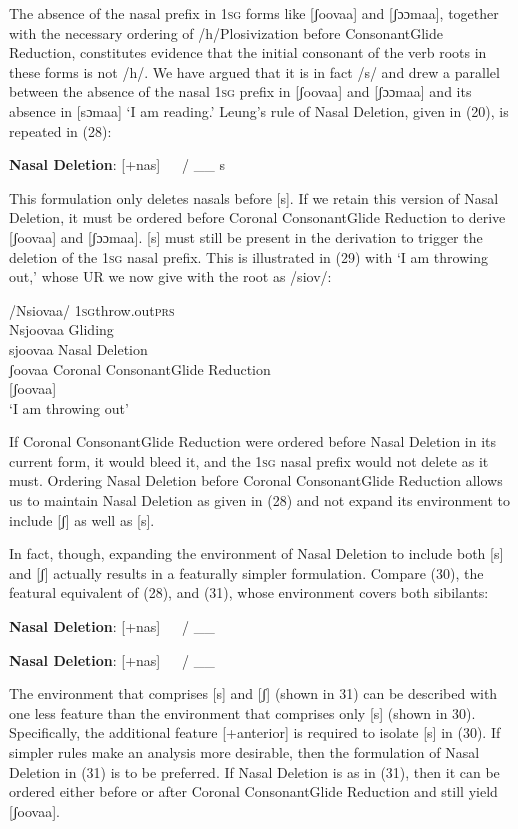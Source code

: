 \documentclass[output=paper]{langsci/langscibook}
\begin{document}
The absence of the nasal prefix in 1\textsc{sg} forms like [ʃoovaa] and [ʃɔɔmaa], together with the necessary ordering of /h/Plosivization before ConsonantGlide Reduction, constitutes evidence that the initial consonant of the verb roots in these forms is not /h/. We have argued that it is in fact /s/ and drew a parallel between the absence of the nasal 1\textsc{sg} prefix in [ʃoovaa] and [ʃɔɔmaa] and its absence in [sɔmaa] ‘I am reading.’ Leung’s rule of Nasal Deletion, given in (20), is repeated in (28):

\ea{}
 \textbf{Nasal Deletion}: [+nas]   / \_\_ s\\{}
\z

This formulation only deletes nasals before [s]. If we retain this version of Nasal Deletion, it must be ordered before Coronal ConsonantGlide Reduction to derive [ʃoovaa] and [ʃɔɔmaa]. [s] must still be present in the derivation to trigger the deletion of the 1\textsc{sg} nasal prefix. This is illustrated in (29) with ‘I am throwing out,’ whose UR we now give with the root as /siov/:

\ea{}
 /Nsiovaa/  \textsc{1sg}throw.out\textsc{prs}\\{}
Nsjoovaa  Gliding\\{}
sjoovaa   Nasal Deletion\\{}
ʃoovaa  Coronal ConsonantGlide Reduction\\{}
[ʃoovaa] \\{}
\glt  ‘I am throwing out’
\z

If Coronal ConsonantGlide Reduction were ordered before Nasal Deletion in its current form, it would bleed it, and the 1\textsc{sg} nasal prefix would not delete as it must. Ordering Nasal Deletion before Coronal ConsonantGlide Reduction allows us to maintain Nasal Deletion as given in (28) and not expand its environment to include [ʃ] as well as [s]. 

In fact, though, expanding the environment of Nasal Deletion to include both [s] and [ʃ] actually results in a featurally simpler formulation. Compare (30), the featural equivalent of (28), and (31), whose environment covers both sibilants:

\ea{}
 \textbf{Nasal Deletion}: [+nas]   / \_\_ \\{}
\z

\ea{}
 \textbf{Nasal Deletion}: [+nas]   / \_\_ \\{}
\z



The environment that comprises [s] and [ʃ] (shown in 31) can be described with one less feature than the environment that comprises only [s] (shown in 30). Specifically, the additional feature [+anterior] is required to isolate [s] in (30). If simpler rules make an analysis more desirable, then the formulation of Nasal Deletion in (31) is to be preferred. If Nasal Deletion is as in (31), then it can be ordered either before or after Coronal ConsonantGlide Reduction and still yield [ʃoovaa]. 
\end{document}
